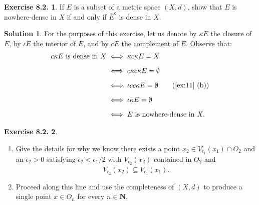 \documentclass[12pt]{article}
\theoremstyle{definition}
\theoremstyle{exercise}
\newtheorem{exercise}{Exercise 8.2.}
\theoremstyle{solution}
\newtheorem*{solution}{Solution}
\newcommand{\setcomp}[1]{#1^{\mathsf{c}}}
\newcommand{\N}{\mathbf{N}}
\begin{document}
\begin{exercise}
\label{ex:13}
    If \( E \) is a subset of a metric space \( (X, d) \), show that \( E \) is nowhere-dense in \( X \) if and only if \( \setcomp{\overline{E}} \) is dense in \( X \).
\end{exercise}

\begin{solution}
    For the purposes of this exercise, let us denote by \( \kappa E \) the closure of \( E \), by \( \iota E \) the interior of \( E \), and by \( c E \) the complement of \( E \). Observe that:
    \begin{align*}
        c \kappa E \text{ is dense in } X &\iff \kappa c \kappa E = X \\[2mm]
        &\iff c \kappa c \kappa E = \emptyset \\[2mm]
        &\iff \iota c c \kappa E = \emptyset \tag{\Cref{ex:11} (b)} \\[2mm]
        &\iff \iota \kappa E = \emptyset \\[2mm]
        &\iff E \text{ is nowhere-dense in } X.
    \end{align*}
\end{solution}

\begin{exercise}
\label{ex:14}
    \begin{enumerate}
        \item Give the details for why we know there exists a point \( x_2 \in V_{\epsilon_1}(x_1) \cap O_2 \) and an \( \epsilon_2 > 0 \) satisfying \( \epsilon_2 < \epsilon_1/2 \) with \( V_{\epsilon_2}(x_2) \) contained in \( O_2 \) and
        \[
            \overline{V_{\epsilon_2}(x_2)} \subseteq V_{\epsilon_1}(x_1).
        \]
        
        \item Proceed along this line and use the completeness of \( (X, d) \) to produce a single point \( x \in O_n \) for every \( n \in \N \).
    \end{enumerate}
\end{exercise}
\end{document}

